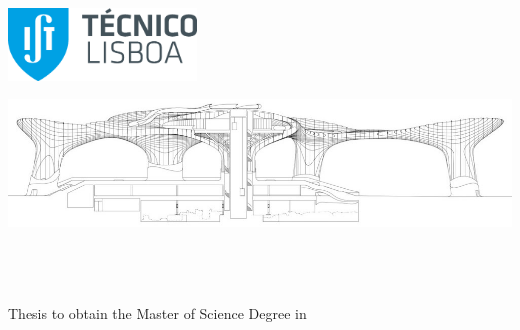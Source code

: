 
\begin{titlepage}
\includegraphics[width=5cm]{images/ist_logo}~\\
%
\if{}
  \vspace*{\finalLogoSpacing}
\else
  \vspace*{\draftLogoSpacing}
\fi

\includegraphics[width=\textwidth]{images/parasol}~\\

\vspace*{\logoHomeSpacing}

\begin{center}
{\LARGE \textbf{\Title}}\\[2.0cm]
{\Large \textbf{\StudentName}}\\[1.5cm]
{\large Thesis to obtain the Master of Science Degree in}\\[0.3cm]
{\LARGE \textbf{\DegreeName}}\\[1.5cm]


\end{center}
\end{titlepage}
